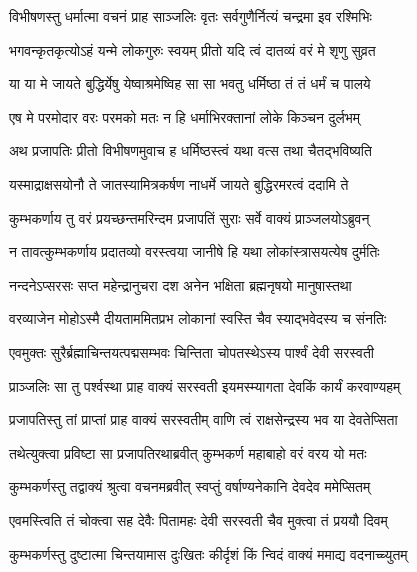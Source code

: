 \twolineshloka
{विभीषणस्तु धर्मात्मा वचनं प्राह साञ्जलिः}
{वृतः सर्वगुणैर्नित्यं चन्द्रमा इव रश्मिभिः} %

\twolineshloka
{भगवन्कृतकृत्योऽहं यन्मे लोकगुरुः स्वयम्}
{प्रीतो यदि त्वं दातव्यं वरं मे शृणु सुव्रत} %

\twolineshloka
{या या मे जायते बुद्धिर्येषु येष्वाश्रमेष्विह}
{सा सा भवतु धर्मिष्ठा तं तं धर्मं च पालये} %

\twolineshloka
{एष मे परमोदार वरः परमको मतः}
{न हि धर्माभिरक्तानां लोके किञ्चन दुर्लभम्} %

\twolineshloka
{अथ प्रजापतिः प्रीतो विभीषणमुवाच ह}
{धर्मिष्ठस्त्वं यथा वत्स तथा चैतद्भविष्यति} %

\twolineshloka
{यस्माद्राक्षसयोनौ ते जातस्यामित्रकर्षण}
{नाधर्मे जायते बुद्धिरमरत्वं ददामि ते} %

\twolineshloka
{कुम्भकर्णाय तु वरं प्रयच्छन्तमरिन्दम}
{प्रजापतिं सुराः सर्वे वाक्यं प्राञ्जलयोऽब्रुवन्} %

\twolineshloka
{न तावत्कुम्भकर्णाय प्रदातव्यो वरस्त्वया}
{जानीषे हि यथा लोकांस्त्रासयत्येष दुर्मतिः} %

\twolineshloka
{नन्दनेऽप्सरसः सप्त महेन्द्रानुचरा दश}
{अनेन भक्षिता ब्रह्मनृषयो मानुषास्तथा} %

\twolineshloka
{वरव्याजेन मोहोऽस्मै दीयताममितप्रभ}
{लोकानां स्वस्ति चैव स्याद्भवेदस्य च संनतिः} %

\twolineshloka
{एवमुक्तः सुरैर्ब्रह्माचिन्तयत्पद्मसम्भवः}
{चिन्तिता चोपतस्थेऽस्य पार्श्वं देवी सरस्वती} %

\twolineshloka
{प्राञ्जलिः सा तु पर्श्वस्था प्राह वाक्यं सरस्वती}
{इयमस्म्यागता देवकिं कार्यं करवाण्यहम्} %

\twolineshloka
{प्रजापतिस्तु तां प्राप्तां प्राह वाक्यं सरस्वतीम्}
{वाणि त्वं राक्षसेन्द्रस्य भव या देवतेप्सिता} %

\twolineshloka
{तथेत्युक्त्वा प्रविष्टा सा प्रजापतिरथाब्रवीत्}
{कुम्भकर्ण महाबाहो वरं वरय यो मतः} %

\twolineshloka
{कुम्भकर्णस्तु तद्वाक्यं श्रुत्वा वचनमब्रवीत्}
{स्वप्तुं वर्षाण्यनेकानि देवदेव ममेप्सितम्} %

\twolineshloka
{एवमस्त्विति तं चोक्त्वा सह देवैः पितामहः}
{देवी सरस्वती चैव मुक्त्वा तं प्रययौ दिवम्} %

\twolineshloka
{कुम्भकर्णस्तु दुष्टात्मा चिन्तयामास दुःखितः}
{कीर्दृशं किं न्विदं वाक्यं ममाद्य वदनाच्च्युतम्} %

